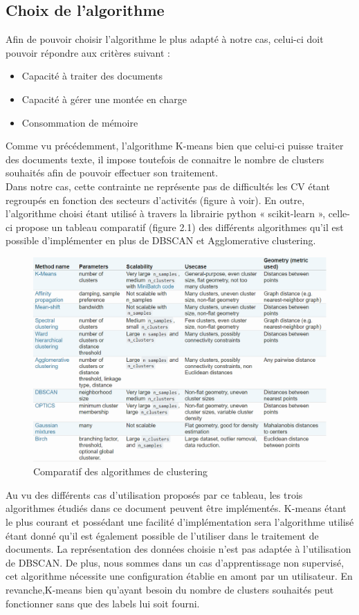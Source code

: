 \documentclass[memoire.tex]{subfiles}
\begin{document}
\newpage
\subsection{Choix de l'algorithme}
Afin de pouvoir choisir l'algorithme le plus adapté à notre cas, celui-ci doit pouvoir répondre aux critères suivant : \begin{itemize}
\item Capacité à traiter des documents
\item Capacité à gérer une montée en charge
\item Consommation de mémoire 
\end{itemize}
Comme vu précédemment, l'algorithme K-means bien que celui-ci puisse traiter des documents texte, il impose toutefois de connaitre le nombre de clusters souhaités afin de pouvoir effectuer son traitement.\\
Dans notre cas, cette contrainte ne représente pas de difficultés les CV étant regroupés en fonction des secteurs d’activités (figure à voir). En outre, l’algorithme choisi étant utilisé à travers la librairie python « scikit-learn », celle-ci propose un tableau comparatif (figure 2.1)  des différents algorithmes qu’il est possible d’implémenter en plus de DBSCAN et Agglomerative clustering.
	\begin{figure}[h!]
		\centerline{\includegraphics[scale=0.6]{img/algo_table.png}}
		\caption{Comparatif des algorithmes de clustering}
	\end{figure}
Au vu des différents cas d’utilisation proposés par ce tableau, les trois algorithmes étudiés dans ce document peuvent être implémentés. K-means étant le plus courant et possédant une facilité d’implémentation sera l’algorithme utilisé étant donné qu’il est également possible de l’utiliser dans le traitement de documents. La représentation des données choisie n'est pas adaptée à l'utilisation de DBSCAN. De plus, nous sommes dans un cas d'apprentissage non supervisé, cet algorithme nécessite une configuration établie en amont par un utilisateur. En revanche,K-means bien qu'ayant besoin du nombre de clusters souhaités peut fonctionner sans que des labels lui soit fourni.
\end{document}

